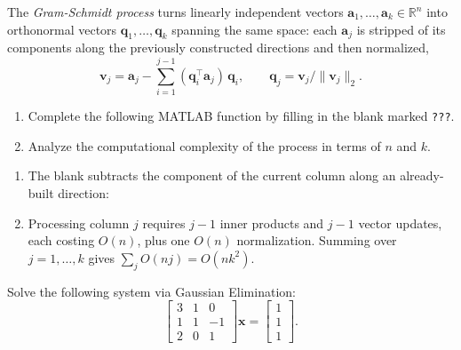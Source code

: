 \begin{exercise} %
    The \emph{Gram-Schmidt process} turns linearly independent vectors $\mathbf{a}_1, \dots, \mathbf{a}_k \in \mathbb{R}^n$ into orthonormal vectors $\mathbf{q}_1, \dots, \mathbf{q}_k$ spanning the same space: each $\mathbf{a}_j$ is stripped of its components along the previously constructed directions and then normalized,
    \begin{equation*}
        \mathbf{v}_j = \mathbf{a}_j - \sum_{i=1}^{j-1} (\mathbf{q}_i^\top \mathbf{a}_j)\, \mathbf{q}_i,
        \qquad
        \mathbf{q}_j = \mathbf{v}_j / \|\mathbf{v}_j\|_2.
    \end{equation*}
    \begin{enumerate}[label=(\alph*)]
        \item Complete the following MATLAB function by filling in the blank marked \texttt{???}.
        
        \item Analyze the computational complexity of the process in terms of $n$ and $k$.
    \end{enumerate}
\end{exercise}

\begin{solution}
    \begin{enumerate}[label=(\alph*)]
        \item The blank subtracts the component of the current column along an already-built direction:
        
        \item Processing column $j$ requires $j-1$ inner products and $j-1$ vector updates, each costing $O(n)$, plus one $O(n)$ normalization. Summing over $j = 1, \dots, k$ gives $\sum_j O(nj) = O(nk^2)$.
    \end{enumerate}
\end{solution}

\begin{exercise} %
    Solve the following system via Gaussian Elimination:
    \[
        \begin{bmatrix}3&1&0\\1&1&-1\\2&0&1\end{bmatrix}\mathbf{x}
        = \begin{bmatrix}1\\1\\1\end{bmatrix}.
    \]
\end{exercise}

